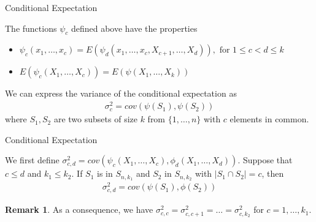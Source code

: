 \documentclass{beamer}
\theoremstyle{definition}
\numberwithin{Def}{section}
\newtheorem{Rmk}{Remark}
\begin{document}
\begin{frame}{Conditional Expectation}
\begin{theorem}\label{cond_exp}
The functions $\psi_c$ defined above have the properties
        \begin{itemize}
            \item $\psi_c(x_1, \dotsc, x_c) = E(\psi_d(x_1, \dotsc, x_c, X_{c+1}, \dotsc, X_d)), \text{ for } 1 \leq c <d \leq k$
            \item $E(\psi_c(X_1, \dotsc, X_c)) = E(\psi(X_1, \dotsc, X_k))$
        \end{itemize}
\end{theorem}

\pause
\begin{theorem}\label{cond_exp_prop}
We can express the variance of the conditional expectation as \begin{align}
    \sigma_c^2 = cov(\psi(S_1), \psi(S_2))
\end{align}
where $S_1, S_2$ are two subsets of size $k$ from $\{1, \dotsc, n\}$ with $c$ elements in common. 
\end{theorem}
\end{frame}

\begin{frame}{Conditional Expectation}
\begin{theorem}
We first define $\sigma_{c,d}^2 = cov(\psi_c(X_1, \dotsc, X_c), \phi_d(X_1, \dotsc, X_d))$. Suppose that $c \leq d$ and $k_1 \leq k_2$. If $S_1$ is in $S_{n,k_1}$ and $S_2$ in $S_{n, k_2}$ with $|S_1 \cap S_2| = c$, then 
    \begin{align}
    \sigma_{c,d}^2 = cov(\psi(S_1), \phi(S_2))
    \end{align}
\end{theorem}
\pause 
\begin{Rmk}
 As a consequence, we have $\sigma_{c,c}^2 = \sigma_{c,c+1}^2 = \dotsc = \sigma_{c,k_2}^2$ for $c = 1, \dotsc, k_1$.    
\end{Rmk}
\end{frame}
\end{document}
